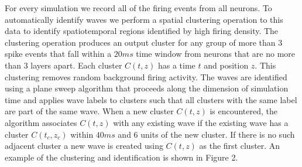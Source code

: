 \documentclass[a4paper,11pt]{article}
\begin{document}
For every simulation we record all of the firing events from all neurons. 
To automatically identify waves we perform a spatial clustering operation to this data to identify spatiotemporal regions identified by high firing density. 
The clustering operation produces an output cluster for any group of more than $3$ spike events that fall within a $20ms$ time window from neurons that are no more than $3$ layers apart.
Each cluster $C(t,z)$ has a time $t$ and position $z$.
This clustering removes random background firing activity. 
The waves are identified using a plane sweep algorithm that proceeds along the dimension of simulation time and applies wave labels to clusters such that all clusters with the same label are part of the same wave.
When a new cluster $C(t,z)$ is encountered, the algorithm associates $C(t,z)$ with any existing wave if the existing wave has a cluster $C(t_c,z_c)$ within $40 ms$ and $6$ units of the new cluster.
If there is no such adjacent cluster a new wave is created using $C(t,z)$ as the first cluster.
An example of the clustering and identification is shown in Figure 2.
\end{document}
